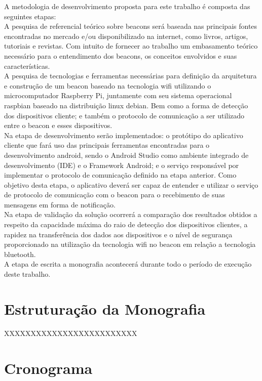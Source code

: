 A metodologia de desenvolvimento proposta para este trabalho é composta das seguintes etapas: \\
\indent A pesquisa de referencial teórico sobre beacons será baseada nas principais fontes encontradas no mercado e/ou disponibilizado na internet, como livros, artigos, tutoriais e revistas. Com intuito de fornecer ao trabalho um embasamento teórico necessário para o entendimento dos beacons, os conceitos envolvidos e suas características. \\
\indent A pesquisa de tecnologias e ferramentas necessárias para definição da arquitetura e construção de um beacon baseado na tecnologia wifi utilizando o microcomputador Raspberry Pi, juntamente com seu sistema operacional raspbian baseado na distribuição linux debian. Bem como a forma de detecção dos dispositivos cliente; e também o protocolo de comunicação a ser utilizado entre o beacon e esses dispositivos. \\
\indent Na etapa de desenvolvimento serão implementados: o protótipo do aplicativo cliente que fará uso das principais ferramentas encontradas para o desenvolvimento android, sendo o Android Studio como ambiente integrado de desenvolvimento (IDE) e o Framework Android; e o serviço responsável por implementar o protocolo de comunicação definido na etapa anterior. Como objetivo desta etapa, o aplicativo deverá ser capaz de entender e utilizar o serviço de protocolo de comunicação com o beacon para o recebimento de suas mensagens em forma de notificação. \\
\indent Na etapa de validação da solução ocorrerá a comparação dos resultados obtidos a respeito da capacidade máxima do raio de detecção dos dispositivos clientes, a rapidez na transferência dos dados aos dispositivos e o nível de segurança proporcionado na utilização da tecnologia wifi no beacon em relação a tecnologia bluetooth. \\
\indent A etapa de escrita a monografia acontecerá durante todo o período de execução deste trabalho.

\section{Estruturação da Monografia}
\label{sec:estruturacao-monografia}

XXXXXXXXXXXXXXXXXXXXXXXXX

\section{Cronograma}
\label{sec:cronograma}

\begin{figure}[h!]
	\centering
\end{figure}